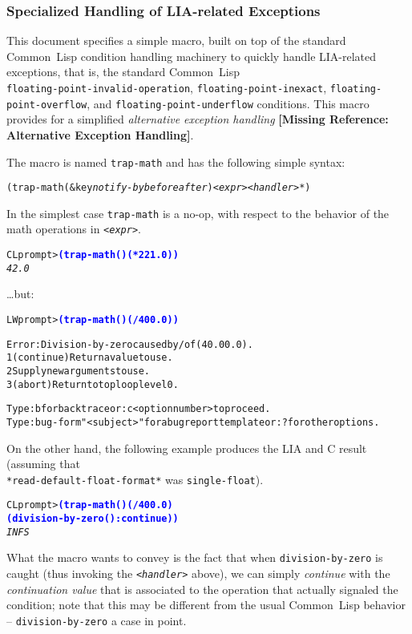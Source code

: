 \documentclass[10pt,fleqn]{article}
\newcommand{\CL}{\textsf{Common~Lisp}}
\newcommand{\CLang}{\textsf{C}}
\newcommand{\checkref}[1]{{\textbf{[Missing Reference: #1]}}}
\newcommand{\code}[1]{\texttt{#1}}
\newcommand{\clieeeterm}[1]{\textit{#1}}
\newcommand{\codeprompt}[1]{\textcolor{blue}{\textbf{#1}}}
\begin{document}
\subsubsection{Specialized Handling of LIA-related Exceptions}

This document specifies a simple macro, built on top of the standard
\CL{} condition handling machinery to quickly handle LIA-related
exceptions, that is, the standard \CL{}\\
\code{floating-point-invalid-operation},
\code{floating-point-inexact},
\code{floating-point-overflow}, and
\code{floating-point-underflow} conditions.  This macro provides for
a simplified \clieeeterm{alternative exception handling}
\checkref{Alternative Exception Handling}.

The macro is named \code{trap-math} and has the following
simple syntax:
\begin{alltt}
  (trap-math (&key \textit{notify-by} \textit{before} \textit{after}) <\textit{expr}> <\textit{handler}>* )
\end{alltt}
In the simplest case \code{trap-math} is a no-op, with
respect to the behavior of the math operations in \code{<\textit{expr}>}.
\begin{alltt}
CL prompt> \codeprompt{(trap-math () (* 2 21.0))}
\textit{42.0}
\end{alltt}
\ldots but:
\begin{alltt}
LW prompt> \codeprompt{(trap-math () (/ 40 0.0))}

Error: Division-by-zero caused by / of (40.0 0.0).
  1 (continue) Return a value to use.
  2 Supply new arguments to use.
  3 (abort) Return to top loop level 0.

Type :b for backtrace or :c <option number> to proceed.
Type :bug-form "<subject>" for a bug report template or :? for other options.
\end{alltt}
On the other hand, the following example produces the LIA and \CLang{} result
(assuming that\\
\code{*read-default-float-format*} was \code{single-float}).
\begin{alltt}
CL prompt> \codeprompt{(trap-math () (/ 40 0.0)
               (division-by-zero () :continue))}
\textit{INFS}
\end{alltt}
What the macro wants to convey is the fact that when
\code{division-by-zero} is caught (thus invoking the
\code{<\textit{handler}>} above), we can simply \emph{continue} with
the \emph{continuation value} that is associated to the operation that
actually signaled the condition; note that this may be different from
the usual \CL{} behavior -- \code{division-by-zero} a case in point.
\end{document}
